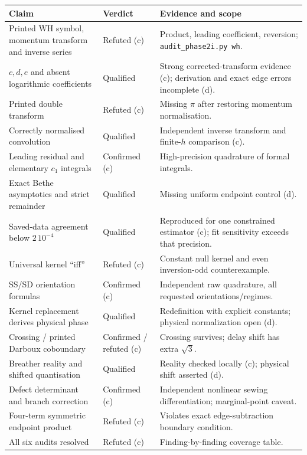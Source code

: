 \documentclass[11pt,a4paper]{article}
\newcommand{\scr}{\texttt{audit\_\allowbreak phase2i.py}}
\begin{document}
\begin{longtable}{@{}L{6.5cm}L{2.3cm}L{6.3cm}@{}}
\toprule Claim & Verdict & Evidence and scope\\\midrule\endhead
Printed WH symbol, momentum transform and inverse series & Refuted (c) & Product, leading coefficient, reversion; \scr\ \texttt{wh}.\\
$c,d,e$ and absent logarithmic coefficients & Qualified & Strong corrected-transform evidence (c); derivation and exact edge errors incomplete (d).\\
Printed double transform & Refuted (c) & Missing $\pi$ after restoring momentum normalisation.\\
Correctly normalised convolution & Qualified & Independent inverse transform and finite-$h$ comparison (c).\\
Leading residual and elementary $c_1$ integrals & Confirmed (c) & High-precision quadrature of formal integrals.\\
Exact Bethe asymptotics and strict remainder & Qualified & Missing uniform endpoint control (d).\\
Saved-data agreement below $2\,10^{-4}$ & Qualified & Reproduced for one constrained estimator (c); fit sensitivity exceeds that precision.\\
Universal kernel ``iff'' & Refuted (c) & Constant null kernel and even inversion-odd counterexample.\\
SS/SD orientation formulas & Confirmed (c) & Independent raw quadrature, all requested orientations/regimes.\\
Kernel replacement derives physical phase & Qualified & Redefinition with explicit constants; physical normalization open (d).\\
Crossing / printed Darboux coboundary & Confirmed / refuted (c) & Crossing survives; delay shift has extra $\sqrt3$.\\
Breather reality and shifted quantisation & Qualified & Reality checked locally (c); physical shift asserted (d).\\
Defect determinant and branch correction & Confirmed (c) & Independent nonlinear sewing differentiation; marginal-point caveat.\\
Four-term symmetric endpoint product & Refuted (c) & Violates exact edge-subtraction boundary condition.\\
All six audits resolved & Refuted (c) & Finding-by-finding coverage table.\\\bottomrule
\end{longtable}
\end{document}

